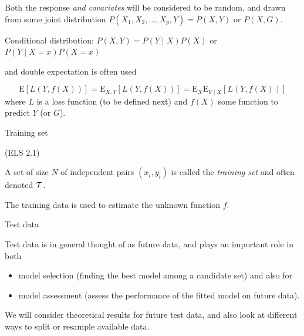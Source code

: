 \documentclass[
  ignorenonframetext,
]{beamer}
\providecommand{\tightlist}{%
  \setlength{\itemsep}{0pt}\setlength{\parskip}{0pt}}
\begin{document}
\begin{frame}

Both the response \emph{and covariates} will be considered to be random,
and drawn from some joint distribution
\(P(X_1,X_2,\ldots, X_p,Y)=P(X,Y)\) or \(P(X,G)\).

Conditional distribution: \(P(X,Y)=P(Y \mid X)P(X)\) or
\(P(Y\mid X=x)P(X=x)\)

and double expectation is often used

\[\text{E}[L(Y,f(X))]=\text{E}_{X,Y}[L(Y,f(X))]=\text{E}_{X}\text{E}_{Y \mid X}[L(Y,f(X))]\]
where \(L\) is a loss function (to be defined next) and \(f(X)\) some
function to predict \(Y\) (or \(G\)).

\end{frame}

\begin{frame}

\begin{block}{Training set}

(ELS 2.1)

A set of size \(N\) of independent pairs \((x_i,y_i)\) is called the
\emph{training set} and often denoted \({\cal T}\).

The training data is used to estimate the unknown function \(f\).

\begin{block}{Test data}

Test data is in general thought of as future data, and plays an
important role in both

\begin{itemize}
\tightlist
\item
  model selection (finding the best model among a candidate set) and
  also for
\item
  model assessment (assess the performance of the fitted model on future
  data).
\end{itemize}

We will consider theoretical results for future test data, and also look
at different ways to split or resample available data.

\end{block}

\end{block}

\end{frame}
\end{document}
